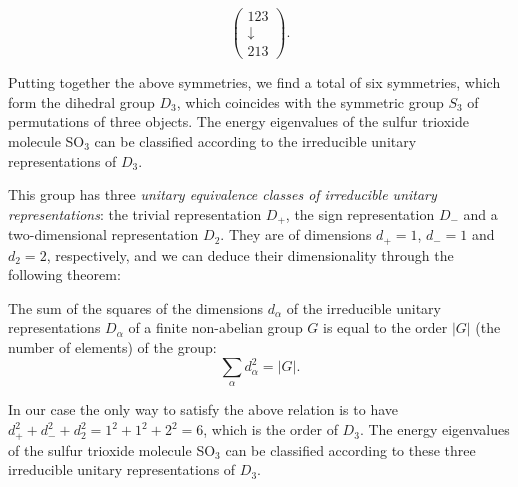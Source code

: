 \begin{example}
\begin{itemize}
\[\begin{pmatrix}
                      123        \\
                      \downarrow \\
                      213
                  \end{pmatrix}.
              \]
    \end{itemize}
    Putting together the above symmetries, we find a total of six symmetries, which form the dihedral group \(D_3\), which coincides with the symmetric group \(S_3\) of permutations of three objects. The energy eigenvalues of the sulfur trioxide molecule SO\(_3\) can be classified according to the irreducible unitary representations of \(D_3\).

    This group has three \textit{unitary equivalence classes of irreducible unitary representations}: the trivial representation \(D_+\), the sign representation \(D_-\) and a two-dimensional representation \(D_2\). They are of dimensions \(d_+ = 1\), \(d_- = 1\) and \(d_2 = 2\), respectively, and we can deduce their dimensionality through the following theorem:
    \begin{theorem}
        The sum of the squares of the dimensions \(d_{\alpha}\) of the irreducible unitary representations \(D_{\alpha}\) of a finite non-abelian group \(G\) is equal to the order \(|G|\) (the number of elements) of the group:
        \[
            \sum_{\alpha} d_{\alpha}^2 = |G|.
        \]
    \end{theorem}
    In our case the only way to satisfy the above relation is to have \(d_+^2 + d_-^2 + d_2^2 = 1^2 + 1^2 + 2^2 = 6\), which is the order of \(D_3\). The energy eigenvalues of the sulfur trioxide molecule SO\(_3\) can be classified according to these three irreducible unitary representations of \(D_3\).
\end{example}